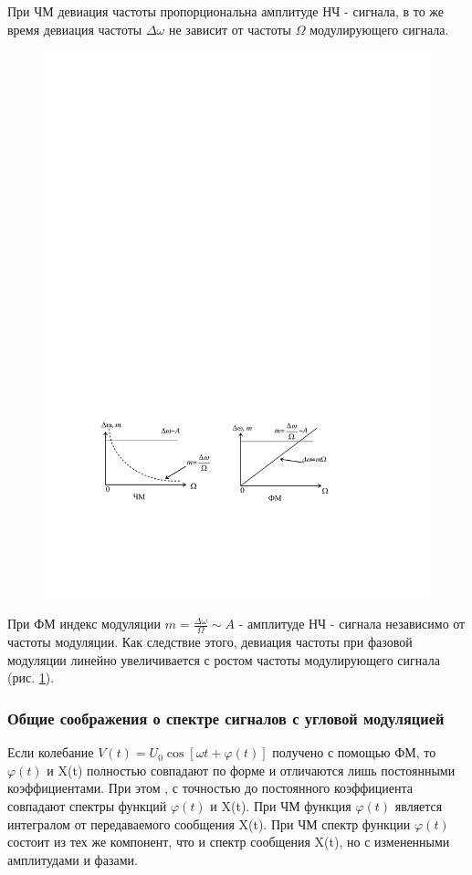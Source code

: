 \documentclass[a4paper,12pt]{article}
\renewcommand{\phi}{\varphi}
\begin{document}
При ЧМ девиация частоты пропорциональна амплитуде НЧ - сигнала, в то же время девиация частоты $\Delta \omega$ не зависит от частоты $\Omega$ модулирующего сигнала.
\begin{figure}[H]
	\centering
	\includegraphics[]{fig/fig2-3}
	\caption{}
	\label{fig:2.3}
\end{figure}
При ФМ индекс модуляции $m=\frac{\Delta \omega}{\Omega} \sim A$ - амплитуде НЧ - сигнала независимо от
частоты модуляции. Как следствие этого, девиация частоты при фазовой модуляции линейно увеличивается с ростом частоты модулирующего сигнала (рис. \ref{fig:2.3}).

\subsubsection{Общие соображения о спектре сигналов с угловой модуляцией}
Если колебание $V(t)=U_{0} \cos [\omega t+\varphi(t)]$
получено с помощью ФМ, то $\phi(t)$ и X(t) полностью совпадают по форме и отличаются лишь постоянными коэффициентами. При этом , с точностью до постоянного коэффициента совпадают спектры функций $\phi(t)$ и X(t).
При ЧМ функция $\phi(t)$ является интегралом от передаваемого сообщения X(t). При ЧМ спектр функции $\phi(t)$ состоит из тех же компонент, что и спектр сообщения X(t), но с измененными амплитудами и фазами.
\end{document}
